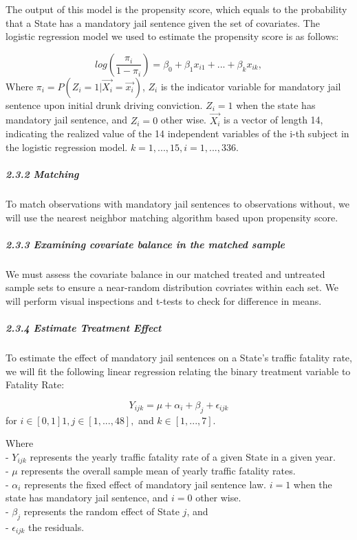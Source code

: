 \documentclass[]{article}
\let\oldsubparagraph\subparagraph
\renewcommand{\subparagraph}[1]{\oldsubparagraph{#1}\mbox{}}
\begin{document}
The output of this model is the propensity score, which equals to the
probability that a State has a mandatory jail sentence given the set of
covariates. The logistic regression model we used to estimate the
propensity score is as follows:

\[
log(\frac{\pi_i}{1-\pi_i}) = \beta_0 + \beta_1x_{i1} + ... + \beta_kx_{ik}, 
\] Where
\(\pi_i = P(Z_i = 1 | \overrightarrow{X_i} = \overrightarrow{x_i})\),
\(Z_i\) is the indicator variable for mandatory jail sentence upon
initial drunk driving conviction. \(Z_i = 1\) when the state has
mandatory jail sentence, and \(Z_i = 0\) other wise.
\(\overrightarrow{X_i}\) is a vector of length 14, indicating the
realized value of the 14 independent variables of the i-th subject in
the logistic regression model. \(k = 1, ..., 15, i = 1,...,336\).

\hypertarget{matching}{%
\subparagraph{2.3.2 Matching}\label{matching}}

To match observations with mandatory jail sentences to observations
without, we will use the nearest neighbor matching algorithm based upon
propensity score.

\hypertarget{examining-covariate-balance-in-the-matched-sample}{%
\subparagraph{2.3.3 Examining covariate balance in the matched
sample}\label{examining-covariate-balance-in-the-matched-sample}}

We must assess the covariate balance in our matched treated and
untreated sample sets to ensure a near-random distribution covriates
within each set. We will perform visual inspections and t-tests to check
for difference in means.

\hypertarget{estimate-treatment-effect}{%
\subparagraph{2.3.4 Estimate Treatment
Effect}\label{estimate-treatment-effect}}

To estimate the effect of mandatory jail sentences on a State's traffic
fatality rate, we will fit the following linear regression relating the
binary treatment variable to Fatality Rate:

\[
Y_{ijk} = \mu + \alpha_i + \beta_j + \epsilon_{ijk}
\] for \(i \in [0, 1] 1, j \in [1, ..., 48],\) and
\(k \in [1, ..., 7]\).

Where\\
- \(Y_{ijk}\) represents the yearly traffic fatality rate of a given
State in a given year.\\
- \(\mu\) represents the overall sample mean of yearly traffic fatality
rates.\\
- \(\alpha_i\) represents the fixed effect of mandatory jail sentence
law. \(i = 1\) when the state has mandatory jail sentence, and \(i = 0\)
other wise.\\
- \(\beta_j\) represents the random effect of State \(j\), and\\
- \(\epsilon_{ijk}\) the residuals.
\end{document}
